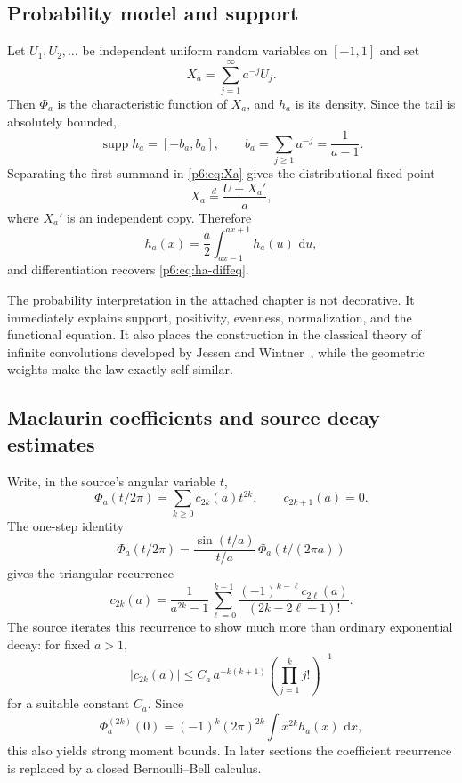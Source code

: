 \documentclass[11pt,oneside]{article}
\numberwithin{equation}{section}
\theoremstyle{definition}
\theoremstyle{remark}
\newcommand{\supp}{\operatorname{supp}}
\newcommand{\dd}{\,\mathrm d}
\begin{document}
\subsection{Probability model and support}

Let $U_1,U_2,\dots$ be independent uniform random variables on $[-1,1]$ and
set
\begin{equation}\label{p6:eq:Xa}
 X_a=\sum_{j=1}^{\infty}a^{-j}U_j.
\end{equation}
Then $\Phi_a$ is the characteristic function of $X_a$, and $h_a$ is its
density.  Since the tail is absolutely bounded,
\begin{equation}\label{p6:eq:ha-support}
 \supp h_a=[-b_a,b_a],\qquad b_a=\sum_{j\ge1}a^{-j}=\frac1{a-1}.
\end{equation}
Separating the first summand in \eqref{p6:eq:Xa} gives the distributional fixed
point
\[
 X_a\overset d=\frac{U+X_a'}a,
\]
where $X_a'$ is an independent copy.  Therefore
\begin{equation}\label{p6:eq:ha-integral-refinement}
 h_a(x)=\frac a2\int_{ax-1}^{ax+1}h_a(u)\,\dd u,
\end{equation}
and differentiation recovers \eqref{p6:eq:ha-diffeq}.

\begin{sourcebox}
The probability interpretation in the attached chapter is not decorative.  It
immediately explains support, positivity, evenness, normalization, and the
functional equation.  It also places the construction in the classical theory
of infinite convolutions developed by Jessen and Wintner~\cite{p6:jessen-wintner}, while the geometric
weights make the law exactly self-similar.
\end{sourcebox}

\subsection{Maclaurin coefficients and source decay estimates}

Write, in the source's angular variable $t$,
\[
 \Phi_a(t/2\pi)=\sum_{k\ge0}c_{2k}(a)t^{2k},
 \qquad c_{2k+1}(a)=0.
\]
The one-step identity
\[
 \Phi_a(t/2\pi)=\frac{\sin(t/a)}{t/a}\,
 \Phi_a(t/(2\pi a))
\]
gives the triangular recurrence
\begin{equation}\label{p6:eq:source-c-recurrence}
 c_{2k}(a)=\frac1{a^{2k}-1}
 \sum_{\ell=0}^{k-1}
 \frac{(-1)^{k-\ell}c_{2\ell}(a)}{(2k-2\ell+1)!}.
\end{equation}
The source iterates this recurrence to show much more than ordinary exponential
decay: for fixed $a>1$,
\begin{equation}\label{p6:eq:c-coeff-superdecay}
 |c_{2k}(a)|\le C_a\,
 a^{-k(k+1)}\left(\prod_{j=1}^{k}j!\right)^{-1}
\end{equation}
for a suitable constant $C_a$.  Since
\[
 \Phi_a^{(2k)}(0)=(-1)^k(2\pi)^{2k}\int x^{2k}h_a(x)\,\dd x,
\]
this also yields strong moment bounds.  In later sections the coefficient
recurrence is replaced by a closed Bernoulli--Bell calculus.
\end{document}
